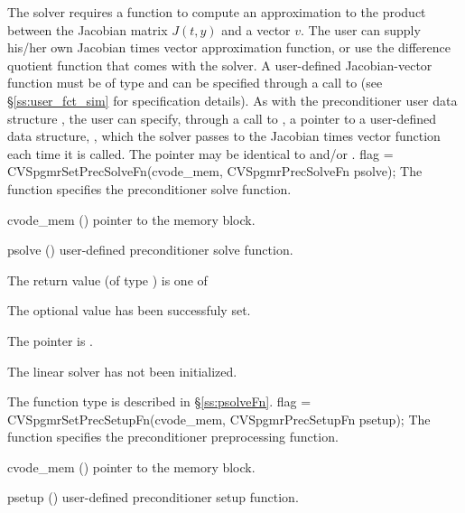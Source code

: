 The 
{\cvspgmr} solver requires a function to compute an approximation to the
product between the Jacobian matrix $J(t,y)$ and a vector $v$.
The user can supply his/her own Jacobian times vector approximation function, 
or use the difference quotient function  
that comes with the {\cvspgmr} solver.
A user-defined Jacobian-vector function must be of type  and 
can be specified through a call to  
(see \S\ref{ss:user_fct_sim} for specification details).
As with the preconditioner user data structure , 
the user can specify, through a call to , a pointer to a 
user-defined data structure, , which
the {\cvspgmr} solver passes to the Jacobian times vector function  each
time it is called.  
The pointer  may be identical to  and/or .
{
  flag = CVSpgmrSetPrecSolveFn(cvode\_mem, CVSpgmrPrecSolveFn psolve);
}
{
  The function  specifies the preconditioner
  solve function.
}
{
  \begin{args}
  \item[cvode\_mem] ()
    pointer to the {\cvodes} memory block.
  \item[psolve] ()
    user-defined preconditioner solve function.
  \end{args}
}
{
  The return value  (of type ) is one of
  \begin{args}
  \item[\Id{SUCCESS}] 
    The optional value has been successfuly set.
  \item[\Id{LIN\_NO\_MEM}]
    The  pointer is .
  \item[\Id{LIN\_NO\_LMEM}]
    The {\cvspgmr} linear solver has not been initialized.
  \end{args}
}
{
   The function type  is described in \S\ref{ss:psolveFn}.
}
{
  flag = CVSpgmrSetPrecSetupFn(cvode\_mem, CVSpgmrPrecSetupFn psetup);
}
{
  The function  specifies the preconditioner
  preprocessing function.
}
{
  \begin{args}
  \item[cvode\_mem] ()
    pointer to the {\cvodes} memory block.
  \item[psetup] ()
    user-defined preconditioner setup function.
  \end{args}
}
